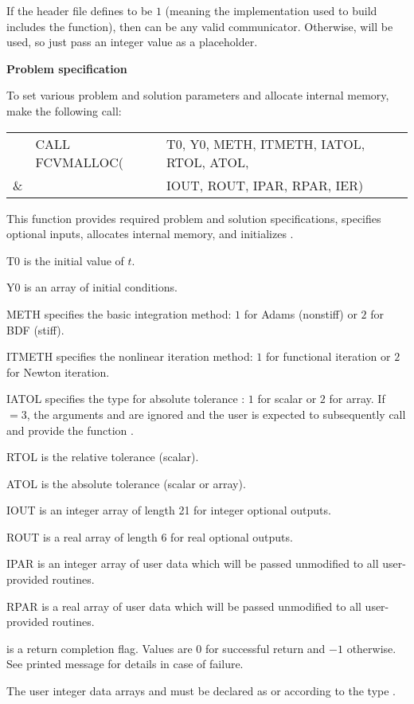 \begin{Steps}
  {\warn}If the header file  defines
   to be $1$ (meaning the {\mpi}
  implementation used to build {\sundials} includes the
   function), then  can be any valid
  {\mpi} communicator. Otherwise,  will be used, so
  just pass an integer value as a placeholder.

\item {\bf Problem specification}

  To set various problem and solution parameters and allocate
  internal memory, make the following call:
  {
    \begin{tabular}[t]{@{}r@{}l@{}l}
        &CALL FCVMALLOC(&T0, Y0, METH, ITMETH, IATOL, RTOL, ATOL, \\
    {\&}&               &IOUT, ROUT, IPAR, RPAR, IER)
    \end{tabular}
  }
  {
    This function provides required problem and solution specifications, 
    specifies optional inputs,
    allocates internal memory, and initializes {\cvode}.
  }
  {
    \begin{args}[ITMETH]
    \item[T0] is the initial value of $t$.
    \item[Y0] is an array of initial conditions.
    \item[METH] specifies the  basic integration method: 
      $1$ for Adams (nonstiff) or $2$ for BDF (stiff).
    \item[ITMETH] specifies the nonlinear iteration method: 
      $1$ for functional iteration or $2$ for Newton iteration.
    \item[IATOL] specifies the type for absolute tolerance :
      $1$ for scalar or $2$ for array. If $=3$, the arguments
       and  are ignored and the user is expected to
      subsequently call  and provide the function .
    \item[RTOL] is the relative tolerance (scalar).
    \item[ATOL] is the absolute tolerance (scalar or array).
    \item[IOUT] is an integer array of length 21 for integer optional outputs.
    \item[ROUT] is a real array of length 6 for real optional outputs.
    \item[IPAR] is an integer array of user data which will be passed
      unmodified to all user-provided routines.
    \item[RPAR] is a real array of user data which will be passed
      unmodified to all user-provided routines.
    \end{args}
  }
  {
     is a return completion flag.  Values are $0$ for successful return
    and $-1$ otherwise. See printed message for details in case of failure.
  }
  {
    The user integer data arrays  and  must be declared as
     or  according to the {\C} type .

}
\end{Steps}
